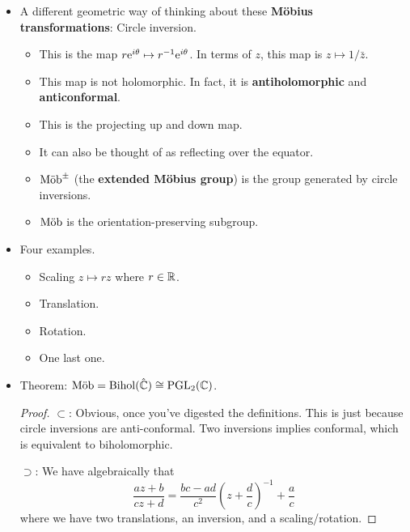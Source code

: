 \documentclass[../notes.tex]{subfiles}
\begin{document}
\begin{itemize}
\begin{itemize}
\begin{proof}
        \end{proof}
    \end{itemize}
    \item A different geometric way of thinking about these \textbf{M\"{o}bius transformations}: Circle inversion.
    \begin{itemize}
        \item This is the map $r\e[i\theta]\mapsto r^{-1}\e[i\theta]$. In terms of $z$, this map is $z\mapsto 1/\bar{z}$.
        \item This map is not holomorphic. In fact, it is \textbf{antiholomorphic} and \textbf{anticonformal}.
        \item This is the projecting up and down map.
        \item It can also be thought of as reflecting over the equator.
        \item $\Mob^\pm$ (the \textbf{extended M\"{o}bius group}) is the group generated by circle inversions.
        \item $\Mob$ is the orientation-preserving subgroup.
    \end{itemize}
    \item Four examples.
    \begin{itemize}
        \item Scaling $z\mapsto rz$ where $r\in\R$.
        \item Translation.
        \item Rotation.
        \item One last one.
    \end{itemize}
    \item Theorem: $\Mob=\Bihol(\hat{\C})\cong\PGL_2(\C)$.
    \begin{proof}
        $\subset$: Obvious, once you've digested the definitions. This is just because circle inversions are anti-conformal. Two inversions implies conformal, which is equivalent to biholomorphic.\par
        $\supset$: We have algebraically that
        \begin{equation*}
            \frac{az+b}{cz+d} = \frac{bc-ad}{c^2}\left( z+\frac{d}{c} \right)^{-1}+\frac{a}{c}
        \end{equation*}
        where we have two translations, an inversion, and a scaling/rotation.
    \end{proof}
\end{itemize}
\end{document}
